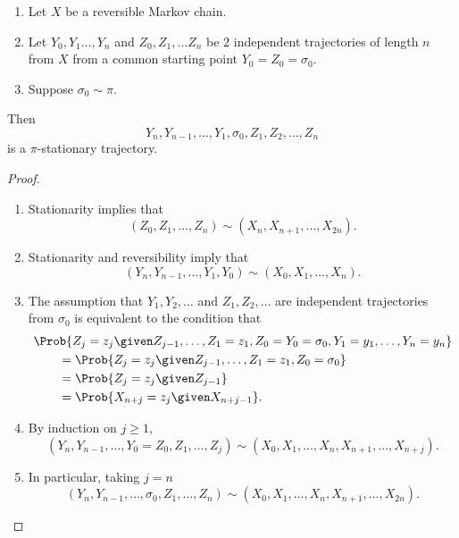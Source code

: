 \documentclass[12pt]{article}
\begin{document}
\begin{lemma}
    \begin{enumerate}
        \item
            Let \( X \) be a reversible Markov chain.
        \item
            Let \( Y_0, Y_1 \dots, Y_n \) and \( Z_0, Z_1, \dots Z_n \)
            be \( 2 \) independent trajectories of length \( n \) from \(
            X \) from a common starting point \( Y_0 = Z_0 = \sigma_0 \).
        \item
            Suppose \( \sigma_0 \sim \pi \).
    \end{enumerate}
    Then
            \[
                Y_n, Y_{n-1}, \dots, Y_1, \sigma_0, Z_1, Z_2, \dots, Z_n
            \] is a \( \pi \)-stationary trajectory.
\end{lemma}

\begin{proof}
            \begin{enumerate}
                \item
                    Stationarity implies that
                    \[
                        (Z_0, Z_1, \dots, Z_n) \sim (X_n, X_{n+1}, \dots,
                        X_{2n}).
                    \] 
                  \item Stationarity and reversibility imply that
                    \[
                        (Y_n, Y_{n-1}, \dots, Y_1, Y_0) \sim (X_0, X_1,
                        \dots, X_n).
                    \]
                \item
                    The assumption that \( Y_1, Y_2, \dots \) and \( Z_1,
                    Z_2, \dots \) are independent trajectories from \(
                    \sigma_0 \) is equivalent to the condition that
                    \begin{align*}
                        & \Prob{ Z_j = z_j \given Z_{j-1}, \dots, Z_1 =
                        z_1, Z_0 = Y_0=\sigma_0, Y_1=y_1, \dots, Y_n = y_n}
                        \\
                        & \qquad = \Prob{ Z_j = z_j \given Z_{j-1},
                        \dots, Z_1 = z_1, Z_0 = \sigma_0} \\
                        & \qquad = \Prob{ Z_j = z_j \given Z_{j-1}} \\
                        &\qquad = \Prob{ X_{n+j} = z_j \given X_{n+j-1}}.
                    \end{align*}
                \item
                    By induction on \( j \ge 1 \),
                    \[
                        (Y_n, Y_{n-1}, \dots, Y_0=Z_0, Z_1, \dots, Z_j)
                        \sim (X_0, X_1, \dots, X_n, X_{n+1}, \dots, X_{n+j}).
                    \]
                \item
                    In particular, taking \( j = n \)
                    \[
                        (Y_n, Y_{n-1}, \dots, \sigma_0, Z_1, \dots, Z_n)
                        \sim (X_0, X_1, \dots, X_n, X_{n+1}, \dots, X_{2n}).
                    \]
            \end{enumerate}
\end{proof}
\end{document}
